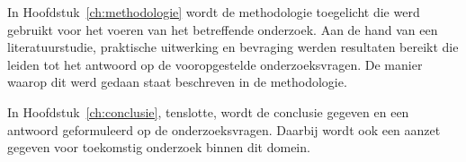 In Hoofdstuk~\ref{ch:methodologie} wordt de methodologie toegelicht die werd gebruikt voor het voeren van het betreffende onderzoek. Aan de hand van een literatuurstudie, praktische uitwerking en bevraging werden resultaten bereikt die leiden tot het antwoord op de vooropgestelde onderzoeksvragen. De manier waarop dit werd gedaan staat beschreven in de methodologie.


In Hoofdstuk~\ref{ch:conclusie}, tenslotte, wordt de conclusie gegeven en een antwoord geformuleerd op de onderzoeksvragen. Daarbij wordt ook een aanzet gegeven voor toekomstig onderzoek binnen dit domein.